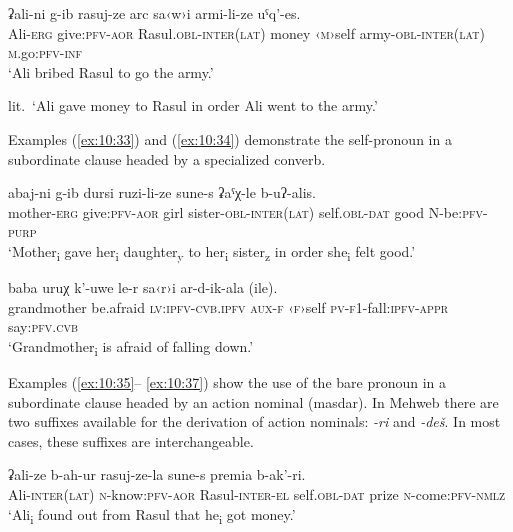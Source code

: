 ﻿\documentclass[output=paper]{langsci/langscibook}
\begin{document}
\ex \label{ex:10:32} %
\gll  ʡali-ni g-ib rasuj-ze arc sa‹w›i armi-li-ze uˤq'-es.\\
Ali-\textsc{erg} give:\textsc{pfv}-\textsc{aor} Rasul.\textsc{obl}-\textsc{inter}(\textsc{lat}) money ‹\textsc{m}›self army-\textsc{obl}-\textsc{inter}(\textsc{lat}) \textsc{m}.go:\textsc{pfv}-\textsc{inf}\\ 
\glt `Ali bribed Rasul to go the army.'

lit.\ `Ali gave money to Rasul in order Ali went to the army.'
\z

Examples (\ref{ex:10:33}) and (\ref{ex:10:34}) demonstrate the self-pronoun in a subordinate
clause headed by a specialized converb.

\ea \label{ex:10:33} %
\gll  abaj-ni g-ib dursi ruzi-li-ze sune-s ʡaˤχ-le b-uʔ-alis.\\
mother-\textsc{erg} give:\textsc{pfv}-\textsc{aor} girl sister-\textsc{obl}-\textsc{inter}(\textsc{lat}) self.\textsc{obl}-\textsc{dat} good N-be:\textsc{pfv}-\textsc{purp}\\ 
\glt `Mother\textsubscript{i} gave her\textsubscript{i}
daughter\textsubscript{y} to her\textsubscript{i}
sister\textsubscript{z} in order she\textsubscript{i} felt good.'

\ex \label{ex:10:34} %
\gll  baba uruχ k'-uwe le-r sa‹r›i ar-d-ik-ala (ile).\\
grandmother be.afraid \textsc{lv}:\textsc{ipfv}-\textsc{cvb.ipfv} \textsc{aux}-\textsc{f} ‹\textsc{f}›self \textsc{pv}-\textsc{f1}-fall:\textsc{ipfv}-\textsc{appr} say:\textsc{pfv}.\textsc{cvb}\\ 
\glt `Grandmother\textsubscript{i} is afraid of falling down.'
\z

Examples (\ref{ex:10:35}–%
\ref{ex:10:37}) show the use of the bare pronoun in a
subordinate clause headed by an action nominal (masdar). In Mehweb there
are two suffixes available for the derivation of action nominals:
\emph{-ri} and \emph{-deš}. In most cases, these suffixes are
interchangeable.

\ea \label{ex:10:35} %
\gll  ʡali-ze b-ah-ur rasuj-ze-la sune-s premia b-ak'-ri.\\
Ali-\textsc{inter}(\textsc{lat}) \textsc{n}-know:\textsc{pfv}-\textsc{aor} Rasul-\textsc{inter}-\textsc{el} self.\textsc{obl}-\textsc{dat} prize \textsc{n}-come:\textsc{pfv}-\textsc{nmlz}\\ 
\glt `Ali\textsubscript{i} found out from Rasul that he\textsubscript{i} got
money.'
\end{document}
